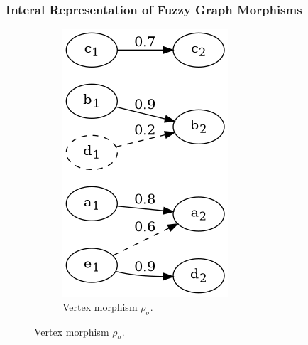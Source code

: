 \begin{frame}
	\frametitle{Interal Representation of Fuzzy Graph Morphisms}


	\begin{figure}[htbp]
		\centering
		\begin{subfigure}[t]{0.20\textwidth}
			\centering
			\includegraphics[width=\linewidth,valign=t]{inc/fuzzy_graph_theory/fuzzy_graph_morphism_internal_rho_sigma.png}
			\caption{Vertex morphism $\rho_{\sigma}$.}
		\end{subfigure}

\end{figure}
\end{frame}
